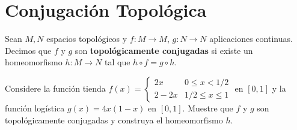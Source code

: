 \section{Conjugación Topológica}

\begin{definicion}
	Sean $M, N$ espacios topológicos y $f: M \to M$, $g: N \to N$ aplicaciones continuas. Decimos que $f$ y $g$ son \textbf{topológicamente conjugadas} si existe un homeomorfismo $h: M \to N$ tal que $h \circ f = g \circ h$.
\end{definicion}

\begin{ejemplo}
	Considere la función tienda $f(x) = \begin{cases} 2x & 0 \le x < 1/2 \\ 2-2x & 1/2 \le x \le 1 \end{cases}$ en $[0,1]$ y la función logística $g(x) = 4x(1-x)$ en $[0,1]$. Muestre que $f$ y $g$ son topológicamente conjugadas y construya el homeomorfismo $h$.
\end{ejemplo}

